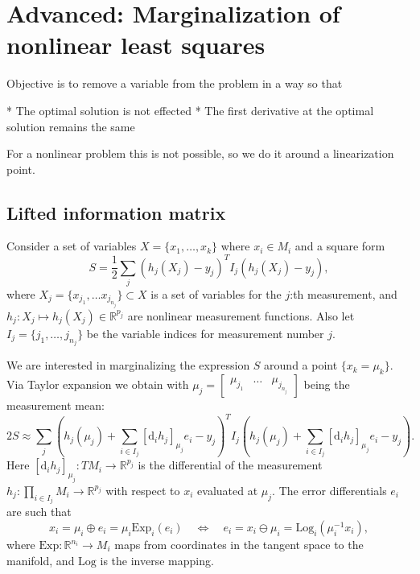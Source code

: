 
\chapter{Advanced: Marginalization of nonlinear least squares}

Objective is to remove a variable from the problem in a way so that

* The optimal solution is not effected
* The first derivative at the optimal solution remains the same

For a nonlinear problem this is not possible, so we do it around a linearization point.

\section{Lifted information matrix}

Consider a set of variables $X = \{ x_1, \ldots, x_k \}$ where $x_i \in M_i$ and a square form
$$
  S = \frac{1}{2} \sum_j \left( h_j(X_j) - y_j \right)^T I_j \left( h_j(X_j) - y_j \right),
$$
where $X_j = \{ x_{j_1}, \ldots x_{j_{n_j}}\} \subset X$ is a set of variables for the $j$:th measurement, and $h_j : X_j \mapsto h_j(X_j) \in \mathbb{R}^{p_j}$ are nonlinear measurement functions. Also let $I_j = \{ j_1, \ldots, j_{n_j} \}$ be the variable indices for measurement number $j$.

We are interested in marginalizing the expression $S$ around a point $\{ x_k = \mu_k \}$. Via Taylor expansion we obtain with $\mu_j = \begin{bmatrix} \mu_{j_1} & \ldots & \mu_{j_{n_j}} \end{bmatrix}$ being the measurement mean:
$$
  2S \approx  \sum_j \left( h_j(\mu_j) + \sum_{i \in I_j} [\mathrm{d}_i h_j]_{\mu_j} e_i - y_j \right)^T I_j \left( h_j(\mu_j) + \sum_{i \in I_j} [\mathrm{d}_i h_j]_{\mu_j} e_i - y_j \right).
$$
Here $[\mathrm{d}_i h_j]_{\mu_j} : T M_i \rightarrow \mathbb{R}^{p_j}$ is the differential of the measurement $h_j: \prod_{i \in I_j} M_i \rightarrow \mathbb{R}^{p_j}$ with respect to $x_i$ evaluated at $\mu_j$. The error differentials $e_i$ are such that
$$
  x_i = \mu_i \oplus e_i = \mu_i \mathrm{Exp}_i(e_i) \quad \Longleftrightarrow \quad e_i = x_i \ominus \mu_i = \textrm{Log}_i (\mu_i^{-1} x_i),
$$
where $\mathrm{Exp} : \mathbb{R}^{n{_i}} \rightarrow M_i$ maps from coordinates in the tangent space to the manifold, and $\mathrm{Log}$ is the inverse mapping.

